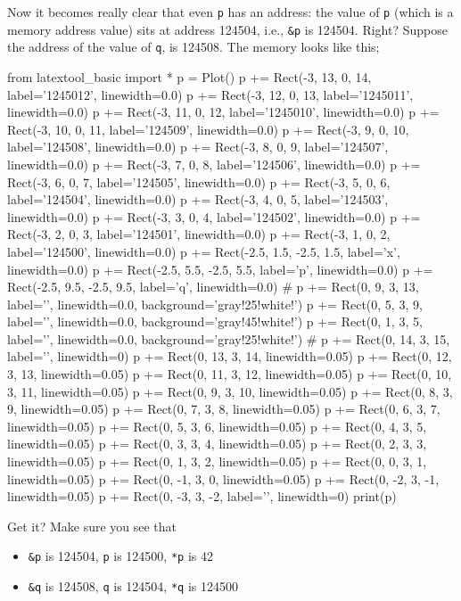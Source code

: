 Now it becomes really clear that even \texttt{p} has an address: the value of \texttt{p} (which is a memory address value) sits at address 124504, i.e., \texttt{\&p} is 124504. Right? Suppose the address of the value of \texttt{q}, is 124508. The memory looks like this;

\begin{python}
from latextool_basic import *
p = Plot()
p += Rect(-3, 13, 0, 14, label='1245012', linewidth=0.0)
p += Rect(-3, 12, 0, 13, label='1245011', linewidth=0.0)
p += Rect(-3, 11, 0, 12, label='1245010', linewidth=0.0)
p += Rect(-3, 10, 0, 11, label='124509', linewidth=0.0)
p += Rect(-3, 9, 0, 10, label='124508', linewidth=0.0)
p += Rect(-3, 8, 0, 9, label='124507', linewidth=0.0)
p += Rect(-3, 7, 0, 8, label='124506', linewidth=0.0)
p += Rect(-3, 6, 0, 7, label='124505', linewidth=0.0)
p += Rect(-3, 5, 0, 6, label='124504', linewidth=0.0)
p += Rect(-3, 4, 0, 5, label='124503', linewidth=0.0)
p += Rect(-3, 3, 0, 4, label='124502', linewidth=0.0)
p += Rect(-3, 2, 0, 3, label='124501', linewidth=0.0)
p += Rect(-3, 1, 0, 2, label='124500', linewidth=0.0)
p += Rect(-2.5, 1.5, -2.5, 1.5, label='x', linewidth=0.0)
p += Rect(-2.5, 5.5, -2.5, 5.5, label='p', linewidth=0.0)
p += Rect(-2.5, 9.5, -2.5, 9.5, label='q', linewidth=0.0)
#
p += Rect(0, 9, 3, 13, label='', linewidth=0.0, background='gray!25!white!')
p += Rect(0, 5, 3, 9, label='', linewidth=0.0, background='gray!45!white!')
p += Rect(0, 1, 3, 5, label='', linewidth=0.0, background='gray!25!white!')
#
p += Rect(0, 14, 3, 15, label='', linewidth=0)
p += Rect(0, 13, 3, 14, linewidth=0.05)
p += Rect(0, 12, 3, 13, linewidth=0.05)
p += Rect(0, 11, 3, 12, linewidth=0.05)
p += Rect(0, 10, 3, 11, linewidth=0.05)
p += Rect(0, 9, 3, 10,  linewidth=0.05)
p += Rect(0, 8, 3, 9,  linewidth=0.05)
p += Rect(0, 7, 3, 8,  linewidth=0.05)
p += Rect(0, 6, 3, 7,  linewidth=0.05)
p += Rect(0, 5, 3, 6,  linewidth=0.05)
p += Rect(0, 4, 3, 5,  linewidth=0.05)
p += Rect(0, 3, 3, 4,  linewidth=0.05)
p += Rect(0, 2, 3, 3,  linewidth=0.05)
p += Rect(0, 1, 3, 2,  linewidth=0.05)
p += Rect(0, 0, 3, 1,  linewidth=0.05)
p += Rect(0, -1, 3, 0,  linewidth=0.05)
p += Rect(0, -2, 3, -1,  linewidth=0.05)
p += Rect(0, -3, 3, -2, label='', linewidth=0)
print(p)
\end{python}

Get it? Make sure you see that

\begin{itemize}

\item
  \texttt{\&p} is 124504, \texttt{p} is 124500, \texttt{*p} is 42
\item
  \texttt{\&q} is 124508, \texttt{q} is 124504, \texttt{*q} is 124500
\end{itemize}

